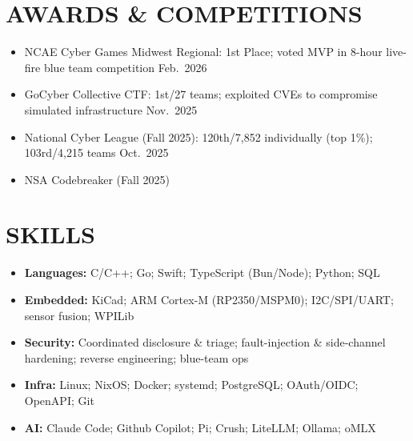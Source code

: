 \documentclass[a4paper,10pt]{article}
\begin{document}
\section{AWARDS \& COMPETITIONS}
\begin{itemize}[nosep,leftmargin=1em,itemsep=1pt,label=--]
  \item NCAE Cyber Games Midwest Regional: 1st Place; voted MVP in 8-hour live-fire blue team competition \hfill Feb.\ 2026
  \item GoCyber Collective CTF: 1st/27 teams; exploited CVEs to compromise simulated infrastructure \hfill Nov.\ 2025
  \item National Cyber League (Fall 2025): 120th/7{,}852 individually (top 1\%); 103rd/4{,}215 teams \hfill Oct.\ 2025
  \item NSA Codebreaker (Fall 2025)
\end{itemize}

\section{SKILLS}
\begin{itemize}[nosep,leftmargin=1em,itemsep=1pt,label=--]
  \item \textbf{Languages:} C/C++; Go; Swift; TypeScript (Bun/Node); Python; SQL
  \item \textbf{Embedded:} KiCad; ARM Cortex-M (RP2350/MSPM0); I2C/SPI/UART; sensor fusion; WPILib
  \item \textbf{Security:} Coordinated disclosure \& triage; fault-injection \& side-channel hardening; reverse engineering; blue-team ops
  \item \textbf{Infra:} Linux; NixOS; Docker; systemd; PostgreSQL; OAuth/OIDC; OpenAPI; Git
  \item \textbf{AI:} Claude Code; Github Copilot; Pi; Crush; LiteLLM; Ollama; oMLX
\end{itemize}
\end{document}
